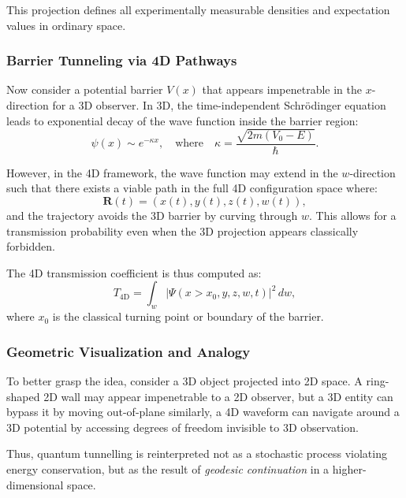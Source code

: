 \documentclass[12pt]{article}
\begin{document}
This projection defines all experimentally measurable densities and expectation values in ordinary space.

\subsubsection*{Barrier Tunneling via 4D Pathways}

Now consider a potential barrier \( V(x) \) that appears impenetrable in the \( x \)-direction for a 3D observer. In 3D, the time-independent Schrödinger equation leads to exponential decay of the wave function inside the barrier region:
\begin{equation}
\psi(x) \sim e^{-\kappa x}, \quad \text{where} \quad \kappa = \frac{\sqrt{2m(V_0 - E)}}{\hbar}.
\label{eq:3d_decay}
\end{equation}

However, in the 4D framework, the wave function may extend in the \( w \)-direction such that there exists a viable path in the full 4D configuration space where:
\begin{equation}
\mathbf{R}(t) = (x(t), y(t), z(t), w(t)),
\end{equation}
and the trajectory avoids the 3D barrier by curving through \( w \). This allows for a transmission probability even when the 3D projection appears classically forbidden.

The 4D transmission coefficient is thus computed as:
\begin{equation}
T_{\text{4D}} = \int_{w} \left| \Psi(x > x_0, y, z, w, t) \right|^2 \, dw,
\label{eq:tunneling_4d}
\end{equation}
where \( x_0 \) is the classical turning point or boundary of the barrier.

\subsubsection*{Geometric Visualization and Analogy}

To better grasp the idea, consider a 3D object projected into 2D space. A ring-shaped 2D wall may appear impenetrable to a 2D observer, but a 3D entity can bypass it by moving out-of-plane similarly, a 4D waveform can navigate around a 3D potential by accessing degrees of freedom invisible to 3D observation.

Thus, quantum tunnelling is reinterpreted not as a stochastic process violating energy conservation, but as the result of \emph{geodesic continuation} in a higher-dimensional space.
\end{document}
